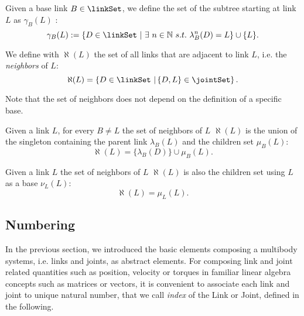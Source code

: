 \begin{definition}
\label{def:subtreeLinks}
Given a base link $B \in \linkSet$, we define the set of the subtree starting at link $L$ as $\gamma_B(L)$ : 
\begin{equation}
\gamma_B(L) := \{ D \in \linkSet \  | \  \exists \ n \in \mathbb{N} \  s.t. \  \lambda_B^n(D) = L \} \cup \{ L \}.
\end{equation}
\end{definition}

\begin{definition}
We define with $\aleph(L)$ the set of all links that are adjacent to link $L$, i.e. the \emph{neighbors} of $L$:
\begin{equation}
\aleph(L) = \left\{ D \in \linkSet \ | \left\{D,L\right\} \in \jointSet  \right\}.
\end{equation}
\end{definition}
Note that the set of neighbors does not depend on the definition of a specific base.


\begin{lemma}
Given a link $L$, for every $B \neq L$ the set of neighbors of $L$ $\aleph(L)$ is the union of the singleton containing the parent link $\lambda_B(L)$ and the children set $\mu_B(L)$:
\begin{equation}
\aleph(L) = \{ \lambda_B(D) \} \cup \mu_B(L).
\end{equation}
\end{lemma}

\begin{lemma}
Given a link $L$ the set of neighbors of $L$ $\aleph(L)$ is also the children set using $L$ as a base $\nu_L(L)$:
\begin{equation}
\aleph(L) = \mu_L(L).
\end{equation}
\end{lemma}




\subsection{Numbering}
In the previous section, we introduced the basic elements composing a multibody systems, i.e. links and joints, as abstract elements. For composing link and joint related quantities such as position, velocity or torques in familiar linear algebra concepts such as matrices or vectors, it is convenient to associate each link and joint to unique natural number, that we call \emph{index} of the Link or Joint, defined in the following.

